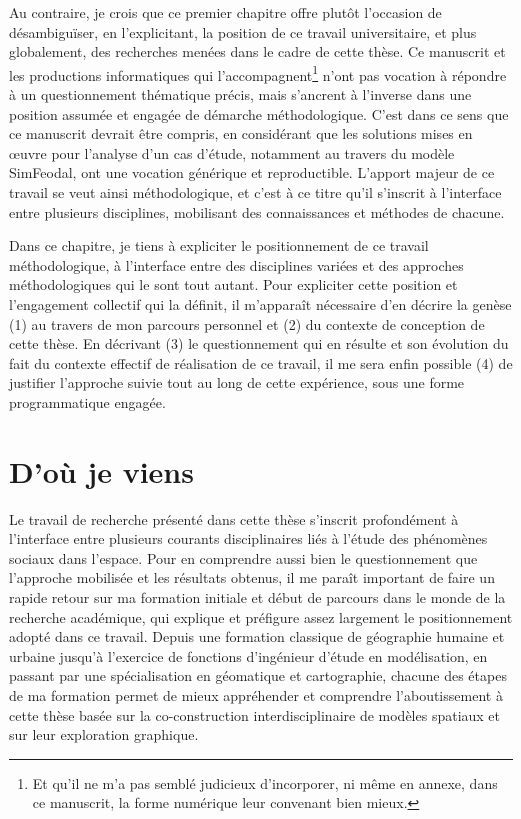 Au contraire, je crois que ce premier chapitre offre plutôt l'occasion de désambiguïser, en l'explicitant, la position de ce travail universitaire, et plus globalement, des recherches menées dans le cadre de cette thèse.
Ce manuscrit et les productions informatiques qui l'accompagnent\footnote{
	Et qu'il ne m'a pas semblé judicieux d'incorporer, ni même en annexe, dans ce manuscrit, la forme numérique leur convenant bien mieux.
} n'ont pas vocation à répondre à un questionnement thématique précis, mais s'ancrent à l'inverse dans une position assumée et engagée de démarche méthodologique.
C'est dans ce sens que ce manuscrit devrait être compris, en considérant que les solutions mises en œuvre pour l'analyse d'un cas d'étude, notamment au travers du modèle SimFeodal, ont une vocation générique et reproductible.
L'apport majeur de ce travail se veut ainsi méthodologique, et c'est à ce titre qu'il s'inscrit à l'interface entre plusieurs disciplines, mobilisant des connaissances et méthodes de chacune.

Dans ce chapitre, je tiens à expliciter le positionnement de ce travail méthodologique, à l'interface entre des disciplines variées et des approches méthodologiques qui le sont tout autant.
Pour expliciter cette position et l'engagement collectif qui la définit, il m'apparaît nécessaire d'en décrire la genèse (1) au travers de mon parcours personnel et (2) du contexte de conception de cette thèse.
En décrivant (3) le questionnement qui en résulte et son évolution du fait du contexte effectif de réalisation de ce travail, il me sera enfin possible (4) de justifier l'approche suivie tout au long de cette expérience, sous une forme programmatique engagée.


\section{D'où je viens \label{sec:formation}}

Le travail de recherche présenté dans cette thèse s'inscrit profondément à l'interface entre plusieurs courants disciplinaires liés à l'étude des phénomènes sociaux dans l'espace.
Pour en comprendre aussi bien le questionnement que l'approche mobilisée et les résultats obtenus, il me paraît important de faire un rapide retour sur ma formation initiale et début de parcours dans le monde de la recherche académique, qui explique et préfigure assez largement le positionnement adopté dans ce travail.
Depuis une formation classique de géographie humaine et urbaine jusqu'à l'exercice de fonctions d'ingénieur d'étude en modélisation, en passant par une spécialisation en géomatique et cartographie, chacune des étapes de ma formation permet de mieux appréhender et comprendre l'aboutissement à cette thèse basée sur la co-construction interdisciplinaire de modèles spatiaux et sur leur exploration graphique.

